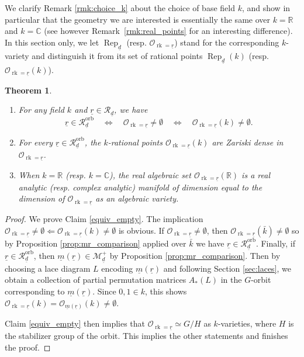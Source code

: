 \documentclass[a4paper]{amsart}
\DeclareMathOperator{\rk}{rk}
\DeclareMathOperator{\Rep}{\mathrm{Rep}}
\newcommand{\R}{\mathbb{R}}
\newcommand{\C}{\mathbb{C}}
\newcommand{\CO}{\mathcal{O}}
\newcommand{\CR}{\mathcal{R}}
\newcommand{\CM}{\mathcal{M}}
\newcommand{\ur}{\underline{r}}
\newcommand{\um}{\underline{m}}
\newcommand{\ud}{\underline{d}}
\newcommand{\orb}{\mathrm{orb}}
\newtheorem{thm}{Theorem}[section]
\theoremstyle{plain}
\begin{document}
We clarify Remark \ref{rmk:choice_k} about the choice of base field $k$, and show in particular that the geometry we are interested is essentially the same over $k=\R$ and $k=\C$ (see however Remark~\ref{rmk:real_points} for an interesting difference). In this section only, we let $\Rep_{\ud}$ (resp. $\CO_{\rk=\ur}$) stand for the corresponding $k$-variety and distinguish it from its set of rational points $\Rep_{\ud}(k)$ (resp. $\CO_{\rk=\ur}(k)$).

\begin{thm}\ \label{thm:base_field}
\begin{enumerate}
        \item\label{equiv_empty} For any field $k$ and $\ur\in \CR_{\ud}$, we have
        \[
        \ur\in \CR^\orb_{\ud}
        \quad \Leftrightarrow\quad
        \CO_{\rk=\ur}\neq\emptyset
        \quad \Leftrightarrow\quad
        \CO_{\rk=\ur}(k)\neq \emptyset.
        \]
        \item For every $\ur\in \CR^{\orb}_{\ud}$, the $k$-rational points $\CO_{\rk=\ur}(k)$ are Zariski dense in $\CO_{\rk=\ur}$.
        
        \item When $k=\R$ (resp. $k=\C$), the real algebraic set $\CO_{\rk=\ur}(\R)$ is a real analytic (resp. complex analytic) manifold of dimension equal to the dimension of $\CO_{\rk=\ur}$ as an algebraic variety.
     \end{enumerate}
\end{thm}
\begin{proof}
We prove Claim \eqref{equiv_empty}. The implication $ \CO_{\rk=\ur}\neq \emptyset \Leftarrow \CO_{\rk=\ur}(k)\neq \emptyset$ is obvious. If $\CO_{\rk=\ur}\neq \emptyset$, then $\CO_{\rk=\ur}(\bar{k})\neq \emptyset $ so by Proposition \ref{prop:mr_comparison} applied over $\bar{k}$ we have $ \ur\in \CR^\orb_{\ud}$. Finally, if $ \ur\in \CR^\orb_{\ud}$, then $\um(\ur)\in \CM^{+}_{\ud}$ by Proposition \ref{prop:mr_comparison}. Then by choosing a lace diagram $L$ encoding $\um(\ur)$ and following Section \ref{sec:laces}, we obtain a collection of partial permutation matrices $A_*(L)$ in the $G$-orbit corresponding to $\um(\ur)$. Since $0,1\in k$, this shows $\CO_{\rk=\ur}(k)=\CO_{\um(\ur)}(k)\neq \emptyset$.

Claim \eqref{equiv_empty} then implies that $\CO_{\rk=\ur}\simeq G/H$ as $k$-varieties, where $H$ is the stabilizer group of the orbit. This implies the other statements and finishes the proof.
\end{proof}
\end{document}
